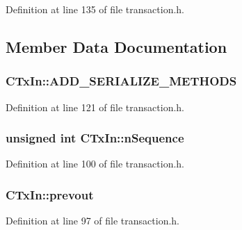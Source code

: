 Definition at line 135 of file transaction.\+h.



\subsection{Member Data Documentation}
\hypertarget{class_c_tx_in_aad2fd3fef5ad4ebe7e54c0db0cc34be4}{}
\subsubsection[{A\+D\+D\+\_\+\+S\+E\+R\+I\+A\+L\+I\+Z\+E\+\_\+\+M\+E\+T\+H\+O\+D\+S}]{\setlength{\rightskip}{0pt plus 5cm}C\+Tx\+In\+::\+A\+D\+D\+\_\+\+S\+E\+R\+I\+A\+L\+I\+Z\+E\+\_\+\+M\+E\+T\+H\+O\+D\+S}\label{class_c_tx_in_aad2fd3fef5ad4ebe7e54c0db0cc34be4}


Definition at line 121 of file transaction.\+h.

\hypertarget{class_c_tx_in_aa0dd08a6ecd0a595d9ef4dad020c1ea5}{}
\subsubsection[{n\+Sequence}]{\setlength{\rightskip}{0pt plus 5cm}unsigned int C\+Tx\+In\+::n\+Sequence}\label{class_c_tx_in_aa0dd08a6ecd0a595d9ef4dad020c1ea5}


Definition at line 100 of file transaction.\+h.

\hypertarget{class_c_tx_in_aed9312051a25380cbd7f123408ab7c20}{}
\subsubsection[{prevout}]{ C\+Tx\+In\+::prevout}\label{class_c_tx_in_aed9312051a25380cbd7f123408ab7c20}


Definition at line 97 of file transaction.\+h.

\hypertarget{class_c_tx_in_a91732c5ffb13520a6989b162ff6683fc}{}
